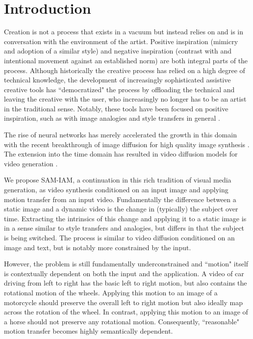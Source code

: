 \section{Introduction}
\label{sec:intro}

	Creation is not a process that exists in a vacuum but instead relies on and is in conversation with the environment of the artist. Positive inspiration (mimicry and adoption of a similar style) and negative inspiration (contrast with and intentional movement against an established norm) are both integral parts of the process. Although historically the creative process has relied on a high degree of technical knowledge, the development of increasingly sophisticated assistive creative tools has ``democratized" the process by offloading the technical and leaving the creative with the user, who increasingly no longer has to be an artist in the traditional sense. Notably, these tools have been focused on positive inspiration, such as with image analogies and style transfers in general \cite{10.1145/383259.383295}. 

The rise of neural networks has merely accelerated the growth in this domain with the recent breakthrough of image diffusion for high quality image synthesis \cite{ho2020denoisingdiffusionprobabilisticmodels}. The extension into the time domain has resulted in video diffusion models for video generation \cite{ho2022videodiffusionmodels}. 

We propose SAM-IAM, a continuation in this rich tradition of visual media generation, as video synthesis conditioned on an input image and applying motion transfer from an input video. Fundamentally the difference between a static image and a dynamic video is the change in (typically) the subject over time. Extracting the intrinsics of this change and applying it to a static image is in a sense similar to style transfers and analogies, but differs in that the subject is being switched. The process is similar to video diffusion conditioned on an image and text, but is notably more constrained by the input.

However, the problem is still fundamentally underconstrained and ``motion" itself is contextually dependent on both the input and the application. A video of car driving from left to right has the basic left to right motion, but also contains the rotational motion of the wheels. Applying this motion to an image of a motorcycle should preserve the overall left to right motion but also ideally map across the rotation of the wheel. In contrast, applying this motion to an image of a horse should not preserve any rotational motion. Consequently, ``reasonable" motion transfer becomes highly semantically dependent. 

